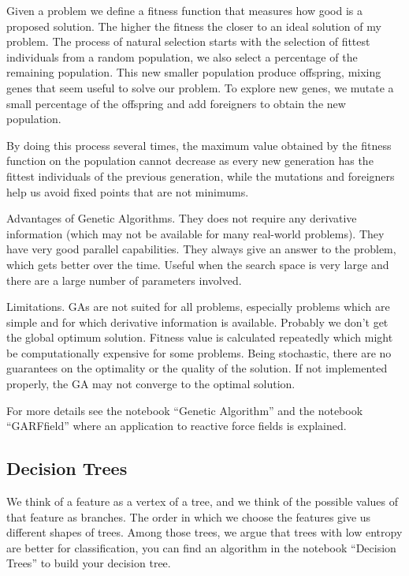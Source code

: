 \documentclass[11pt,letterpaper]{report}
\begin{document}
Given a problem we define a fitness function that measures how good is a proposed solution. The higher the fitness the closer to an ideal solution of my problem.
The process of natural selection starts with the selection of fittest individuals from a random population, we also select a percentage of the remaining population. This new smaller population produce offspring, mixing genes that seem useful to solve our problem. To explore new genes, we mutate a small percentage of the offspring and add foreigners to obtain the new population.

By doing this process several times, the maximum value obtained by the fitness function on the population cannot  decrease as every new generation has the fittest individuals of the previous generation, while the mutations and foreigners help us avoid fixed points that are not minimums. 

Advantages of Genetic Algorithms. They does not require any derivative information (which may not be available for many real-world problems). They have very good parallel capabilities. They always give an answer to the problem, which gets better over the time.
Useful when the search space is very large and there are a large number of parameters involved.

Limitations. GAs are not suited for all problems, especially problems which are simple and for which derivative information is available. Probably we don't get the global optimum solution. Fitness value is calculated repeatedly which might be computationally expensive for some problems.
Being stochastic, there are no guarantees on the optimality or the quality of the solution.
If not implemented properly, the GA may not converge to the optimal solution.
		
For more details see the notebook ``Genetic Algorithm'' and the notebook ``GARFfield'' where an application to reactive force fields is explained.
 
	 \subsection{Decision Trees}
 We think of a feature as a vertex of a tree, and we think of the possible values of that feature as branches. The order in which we choose the features give us different shapes of trees. Among those trees, we argue that trees with low entropy are better for classification, you can find an algorithm in the notebook ``Decision Trees'' to build your decision tree.
\end{document}
